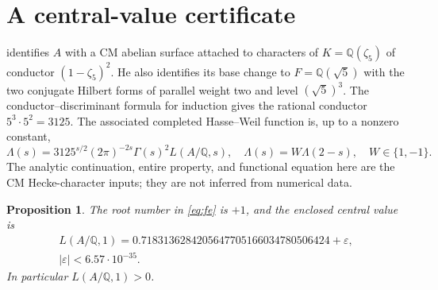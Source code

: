 \documentclass[11pt]{article}
\newcommand{\Q}{\mathbb Q}
\newtheorem{proposition}[theorem]{Proposition}
\theoremstyle{definition}
\begin{document}


\section{A central-value certificate}

\citet[p.~439, following Table 3]{Darmon2000} identifies $A$ with a CM
abelian surface attached to characters of $K=\Q(\zeta_5)$ of conductor
$(1-\zeta_5)^2$. He also identifies its base change to
$F=\Q(\sqrt5)$ with the two conjugate Hilbert forms of parallel weight
two and level $(\sqrt5)^3$. The conductor--discriminant formula for
induction gives the rational conductor $5^3\cdot5^2=3125$.
The associated completed Hasse--Weil function is, up to a nonzero
constant,
\[
\Lambda(s)=3125^{s/2}(2\pi)^{-2s}\Gamma(s)^2 L(A/\Q,s),
\quad \Lambda(s)=W\Lambda(2-s),\quad W\in\{1,-1\}.
\tag{4.1}\label{eq:fe}
\]
The analytic continuation, entire property, and functional equation
here are the CM Hecke-character inputs; they are not inferred from
numerical data.

\begin{proposition}\label{prop:lvalue}
The root number in \eqref{eq:fe} is $+1$, and the enclosed central value is
\[
\begin{gathered}
L(A/\Q,1)=0.7183136284205647705166034780506424+\varepsilon,\\
|\varepsilon|<6.57\cdot10^{-35}.
\end{gathered}
\tag{4.2}\label{eq:lvalue}
\]
In particular $L(A/\Q,1)>0$.
\end{proposition}
\end{document}
